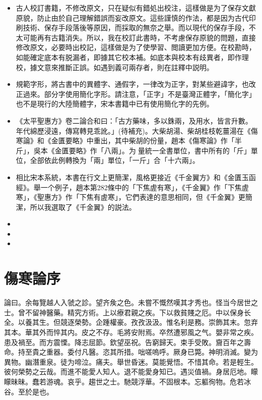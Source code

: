 \begin{itemize}
	\item 古人校訂書籍，不修改原文，只在疑似有錯処出校注，這樣做是为了保存文獻原貌，防止由於自己理解錯誤而妄改原文。這些謹慎的作法，都是因为古代印刷技術、保存手段落後等原因，而採取的無奈之舉。而以現代的保存手段，不太可能再有古籍消失。所以，我在校訂此書時，不考慮保存原貌的問題，直接修改原文，必要時出校記，這樣做是为了使學習、閲讀更加方便。在校勘時，如能確定底本有脱漏者，即據其它校本補。如底本與校本有歧異者，即作理校，據文意來推斷正誤。如遇到義可兩存者，則在註釋中説明。
	
	\item 規範字形，將古書中的異體字、通假字，一律改为正字，對某些避諱字，也改正過來。部分字使用簡化字形。請注意，「正字」不是臺灣正體字，「簡化字」也不是現行的大陸簡體字，宋本書籍中已有使用簡化字的先例。
	
	\item 《太平聖惠方》卷二論合和曰：「古方藥味，多以銖兩，及用水，皆言升數。年代綿歷浸遠，傳寫轉見乖訛。」(待補充)。大柴胡湯、柴胡桂枝乾薑湯在《傷寒論》和《金匱要略》中重出，其中柴胡的份量，趙本《傷寒論》作「半斤」，吳本《金匱要略》作「八兩」。为{\sungii 𥁞}量統一全書單位，書中所有的「斤」單位，全部依此例轉換为「兩」單位，「一斤」合「十六兩」。
	
	\item 相比宋本系統，本書在行文上更簡潔，風格更接近《千金翼方》和《金匱玉函經》。舉一个例子，趙本第282條中的「下焦虗有寒」，《千金翼》作「下焦虗寒」，《聖惠方》作「下焦有虗寒」，它們表達的意思相同，但《千金翼》更簡潔，所以我選取了《千金翼》的説法。
	
	\item 
	
	\item 
	
	\item 

\end{itemize}

\chapter{傷寒論序}

論曰。余每覽越人入虢之診。望齐矦之色。未嘗不慨然嘆其才秀也。怪当今居世之士。曾不留神醫藥。精究方術。上以療君親之疾。下以救貧賤之厄。中以保身长全。以養其生。但競逐榮勢。企踵權豪。孜孜汲汲。惟名利是務。崇飾其末。忽弃其本。華其外而悴其内。皮之不存。毛將安附焉。卒然遭邪風之气。嬰非常之疾。患及禍至。而方震慄。降志屈節。欽望巫祝。告窮歸天。束手受敗。齎百年之壽命。持至貴之重器。委付凡醫。恣其所措。咄嗟嗚呼。厥身已斃。神明消滅。變为異物。幽潛重泉。徒为啼泣。痛夫。舉世昏迷。莫能覺悟。不惜其命。若是輕生。彼何榮勢之云哉。而進不能愛人知人。退不能愛身知已。遇災值禍。身居厄地。矇矇昧昧。蠢若游魂。哀乎。趨世之士。馳競浮華。不固根本。忘軀徇物。危若冰谷。至於是也。

